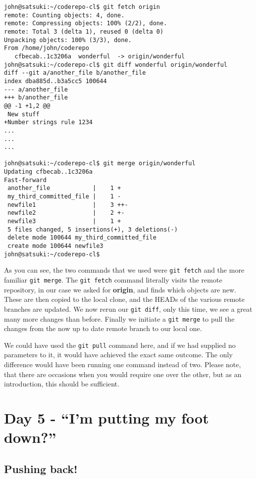 \begin{Verbatim}[frame=leftline,framerule=1mm,fontsize=\relsize{-3}] 
john@satsuki:~/coderepo-cl$ git fetch origin
remote: Counting objects: 4, done.
remote: Compressing objects: 100% (2/2), done.
remote: Total 3 (delta 1), reused 0 (delta 0)
Unpacking objects: 100% (3/3), done.
From /home/john/coderepo
   cfbecab..1c3206a  wonderful  -> origin/wonderful
john@satsuki:~/coderepo-cl$ git diff wonderful origin/wonderful 
diff --git a/another_file b/another_file
index dba885d..b3a5cc5 100644
--- a/another_file
+++ b/another_file
@@ -1 +1,2 @@
 New stuff
+Number strings rule 1234
...
...
...

john@satsuki:~/coderepo-cl$ git merge origin/wonderful 
Updating cfbecab..1c3206a
Fast-forward
 another_file            |    1 +
 my_third_committed_file |    1 -
 newfile1                |    3 ++-
 newfile2                |    2 +-
 newfile3                |    1 +
 5 files changed, 5 insertions(+), 3 deletions(-)
 delete mode 100644 my_third_committed_file
 create mode 100644 newfile3
john@satsuki:~/coderepo-cl$ 
\end{Verbatim}

As you can see, the two commands that we used were \texttt{git fetch} and the more familiar \texttt{git merge}.  The \texttt{git fetch} command literally visits the remote repository, in our case we asked for \textbf{origin}, and finds which objects are new.  These are then copied to the local clone, and the HEADs of the various remote branches are updated.  We now rerun our \texttt{git diff}, only this time, we see a great many more changes than before.  Finally we initiate a \texttt{git merge} to pull the changes from the now up to date remote branch to our local one.

We could have used the \texttt{git pull} command here, and if we had supplied no parameters to it, it would have achieved the exact same outcome.  The only difference would have been running one command instead of two.  Please note, that there are occasions when you would require one over the other, but as an introduction, this should be sufficient.

\section{Day 5 - ``I'm putting my foot down?''}
\subsection{Pushing back!}

